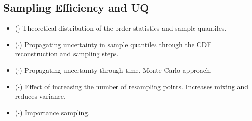 
\subsection{Sampling Efficiency and UQ}

\begin{itemize}
    \item (\checkmark) Theoretical distribution of the order statistics and sample quantiles.
    \item ($\cdot$) Propagating uncertainty in sample quantiles through the CDF reconstruction and sampling steps.
    \item ($\cdot$) Propagating uncertainty through time.  Monte-Carlo approach.
    \item (\checkmark-) Effect of increasing the number of resampling points.  Increases mixing and reduces variance.
    \item (\checkmark-) Importance sampling.
\end{itemize}
